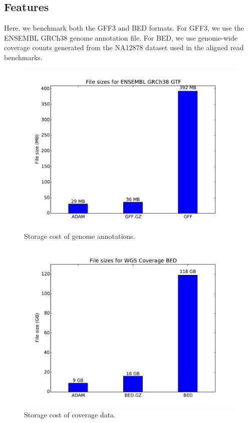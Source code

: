 \documentclass[phd]{ucbthesis}
\begin{document}
\subsection{Features}
\label{sec:feature-storage}

Here, we benchmark both the GFF3 and BED formats. For GFF3, we use the ENSEMBL
GRCh38 genome annotation file. For BED, we use genome-wide coverage counts
generated from the NA12878 dataset used in the aligned read
benchmarks.

\begin{figure}[h]
  \begin{center}
    \includegraphics[width=0.95\linewidth]{graphs/gff.pdf}
  \end{center}
  \caption{Storage cost of genome annotations.}
  \label{fig:annotation-storage}
\end{figure}

\begin{figure}[h]
  \begin{center}
    \includegraphics[width=0.95\linewidth]{graphs/bed.pdf}
  \end{center}
  \caption{Storage cost of coverage data.}
  \label{fig:coverage-storage}
\end{figure}
\end{document}
